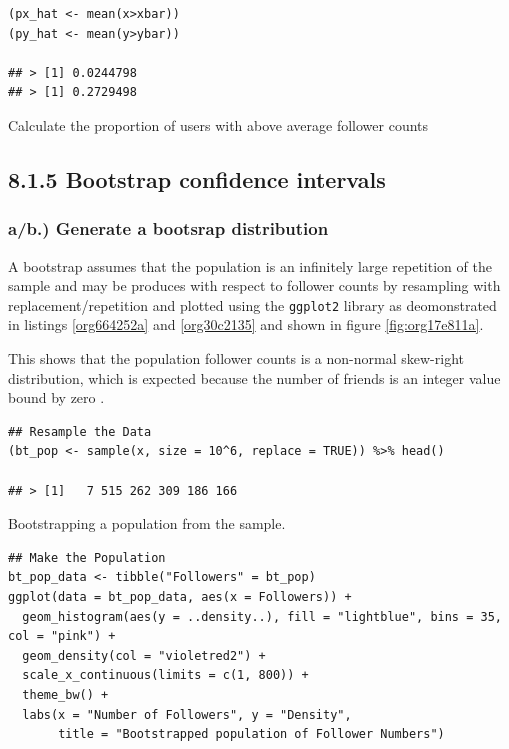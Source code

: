 \documentclass[11pt]{article}
\begin{document}
\begin{listing}[htbp]
\begin{verbatim}
(px_hat <- mean(x>xbar))
(py_hat <- mean(y>ybar))

## > [1] 0.0244798
## > [1] 0.2729498
\end{verbatim}
\caption{\label{org767ccba}Calculate the proportion of users with above average follower counts}
\end{listing}


\subsection{8.1.5 Bootstrap confidence intervals}
\label{sec:org78aeca1}
\subsubsection{a/b.) Generate a bootsrap distribution}
\label{sec:org8dd440e}

A bootstrap assumes that the population is an infinitely large repetition of the
sample and may be produces with respect to follower counts by resampling with
replacement/repetition and plotted using the \texttt{ggplot2} library as deomonstrated
in listings \ref{org664252a} and \ref{org30c2135} and shown in figure \ref{fig:org17e811a}.

This shows that the population follower counts is a non-normal skew-right
distribution, which is expected because the number of friends is an integer value bound by zero \cite{nist2013}.

\begin{listing}[htbp]
\begin{verbatim}
## Resample the Data
(bt_pop <- sample(x, size = 10^6, replace = TRUE)) %>% head()

## > [1]   7 515 262 309 186 166
\end{verbatim}
\caption{\label{org664252a}Bootstrapping a population from the sample.}
\end{listing}

\begin{listing}[htbp]
\begin{verbatim}
## Make the Population
bt_pop_data <- tibble("Followers" = bt_pop)
ggplot(data = bt_pop_data, aes(x = Followers)) +
  geom_histogram(aes(y = ..density..), fill = "lightblue", bins = 35, col = "pink") +
  geom_density(col = "violetred2") +
  scale_x_continuous(limits = c(1, 800)) +
  theme_bw() +
  labs(x = "Number of Followers", y = "Density",
       title = "Bootstrapped population of Follower Numbers")

\end{verbatim}
\label{org30c2135}
\end{listing}
\end{document}
